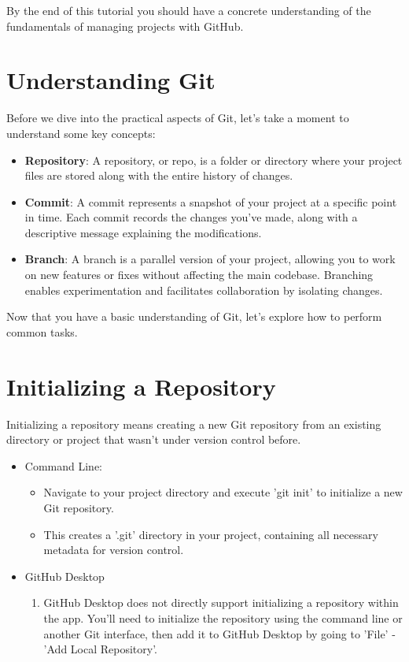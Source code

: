 \documentclass[10pt,twocolumn]{article}
\begin{document}
By the end of this tutorial you should have a concrete understanding of the fundamentals of managing projects with GitHub.


\section{Understanding Git}
Before we dive into the practical aspects of Git, let's take a moment to understand some key concepts:

\begin{itemize}
    \item \textbf{Repository}: A repository, or repo, is a folder or directory where your project files are stored along with the entire history of changes.
    
    \item \textbf{Commit}: A commit represents a snapshot of your project at a specific point in time. Each commit records the changes you've made, along with a descriptive message explaining the modifications.
    
    \item \textbf{Branch}: A branch is a parallel version of your project, allowing you to work on new features or fixes without affecting the main codebase. Branching enables experimentation and facilitates collaboration by isolating changes.
\end{itemize}

Now that you have a basic understanding of Git, let's explore how to perform common tasks.

\section{Initializing a Repository}

Initializing a repository means creating a new Git repository from an existing directory or project that wasn't under version control before.

\begin{itemize}
    \item Command Line: 
    \begin{itemize}
        \item  Navigate to your project directory and execute 'git init' to initialize a new Git repository.
        \item This creates a '.git' directory in your project, containing all necessary metadata for version control.
    \end{itemize}
    \item GitHub Desktop
    \begin{enumerate}
        \item GitHub Desktop does not directly support initializing a repository within the app. You'll need to initialize the repository using the command line or another Git interface, then add it to GitHub Desktop by going to 'File' - 'Add Local Repository'.
    \end{enumerate}
    
\end{itemize}
\end{document}
